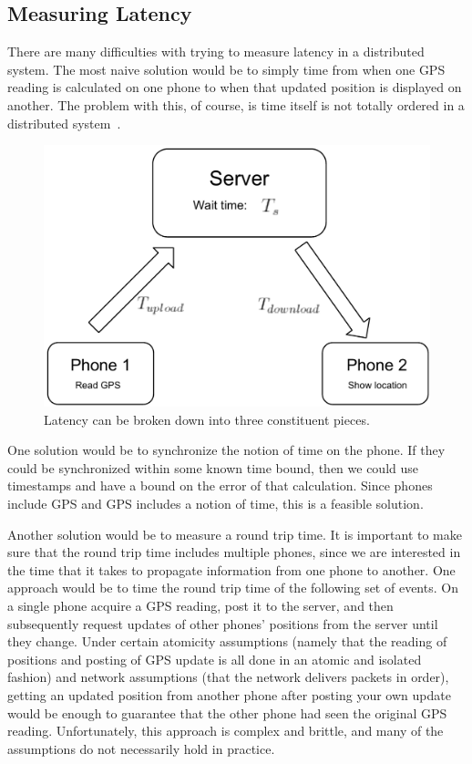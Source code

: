 \documentclass{acm_proc_article-sp}
\begin{document}
\subsection{Measuring Latency}\label{measuring}

There are many difficulties with trying to measure latency in a
distributed system.  The most naive solution would be to simply time
from when one GPS reading is calculated on one phone to when that
updated position is displayed on another. The problem with this, of
course, is time itself is not totally ordered in a distributed
system~\cite{Lamport:1978:TCO}.

\begin{figure}
\centering
\includegraphics[scale=0.4]{figs/LatencyExplanation}
\caption{Latency can be broken down into three constituent pieces.}
\label{fig:LatencyExplanation}
\end{figure}

One solution would be to synchronize the notion of time on the phone.
If they could be synchronized within some known time bound, then we
could use timestamps and have a bound on the error of that
calculation.  Since phones include GPS and GPS includes a notion of
time, this is a feasible solution.

Another solution would be to measure a round trip time.  It is
important to make sure that the round trip time includes multiple
phones, since we are interested in the time that it takes to propagate
information from one phone to another.  One approach would be to time
the round trip time of the following set of events.  On a single phone
acquire a GPS reading, post it to the server, and then subsequently
request updates of other phones' positions from the server until they
change.  Under certain atomicity assumptions (namely that the reading
of positions and posting of GPS update is all done in an atomic and
isolated fashion) and network assumptions (that the network delivers
packets in order), getting an updated position from another phone
after posting your own update would be enough to guarantee that the
other phone had seen the original GPS reading.  Unfortunately, this
approach is complex and brittle, and many of the assumptions do not
necessarily hold in practice.
\end{document}
